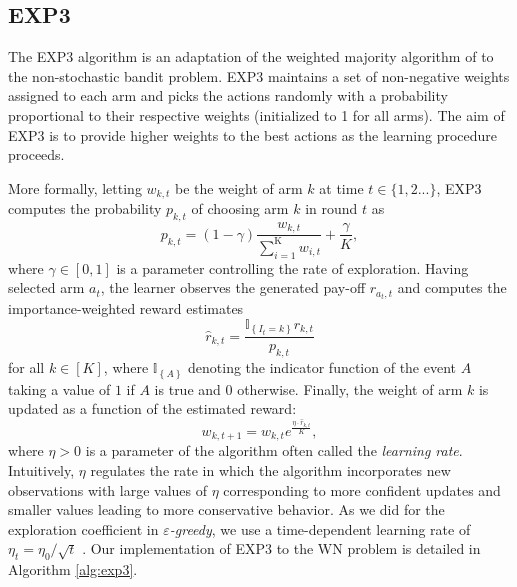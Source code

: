 \documentclass[10pt,journal,compsoc]{IEEEtran}
\begin{document}
	\subsection{EXP3}
	\label{section:bandits_exp3}	
	The EXP3 algorithm \cite{auer1995gambling,auer2002nonstochastic} is an adaptation of the weighted majority algorithm of \cite{LW94,FS97} to the non-stochastic bandit problem. EXP3 maintains a set of non-negative weights assigned to each arm and picks the actions randomly with a probability proportional to their respective weights (initialized to 1 for all arms). The aim of EXP3 is to provide higher weights to the best actions as the learning procedure proceeds. 
	
	More formally, letting $w_{k,t}$ be the weight of arm $k$ at time $t \in \{1,2 ...\}$, EXP3 computes the probability $p_{k,t}$ of choosing arm $k$ in round $t$ as
	\begin{equation}
	\label{eq:exp3_prob}
	p_{k,t} = (1-\gamma) \frac{w_{k,t}}{\sum_{i=1}^{\text{K}}w_{i,t}} + \frac{\gamma}{K},
	\nonumber
	\end{equation}
	where $\gamma\in[0,1]$ is a parameter controlling the rate of exploration.
	Having selected arm $a_t$, the learner observes the generated pay-off $r_{a_t,t}$ and computes the importance-weighted reward estimates
	\begin{equation}
	\label{eq:exp3_estimated_reward}
	\widehat{r}_{k,t} = \frac{\mathbb{I}_{\left\{I_t = k\right\}}r_{k,t}}{p_{k,t}}
	\nonumber
	\end{equation}
	for all $k\in[K]$, where $\mathbb{I}_{\left\{A \right\}}$ denoting the indicator function of the event $A$ taking a value of $1$ if $A$ is true and $0$ otherwise.
	Finally, the weight of arm $k$ is updated as a function of the estimated reward:
	\begin{equation}
	\label{eq:exp3_weights}
	w_{k,t+1}=w_{k,t} e^{\frac{\eta \cdot \widehat{r}_{k,t}}{K}},
	\nonumber
	\end{equation}	
	where $\eta>0$ is a parameter of the algorithm often called the \emph{learning rate}. Intuitively, $\eta$ regulates the rate in which the algorithm incorporates new observations with large values of $\eta$ corresponding to more confident updates and smaller values leading to more conservative behavior. As we did for the exploration coefficient in \emph{$\varepsilon$-greedy}, we use a time-dependent learning rate of $\eta_t = \eta_0 / \sqrt{t}$ \cite{auer2002finite}. Our implementation of EXP3 to the WN problem is detailed in Algorithm \ref{alg:exp3}.
\end{document}
